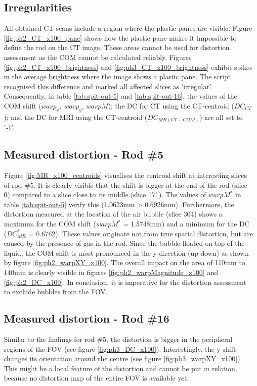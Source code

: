 \subsection{Irregularities}
All obtained CT scans include a region where the plastic panes are visible.
Figure \ref{fig:ph2_CT_x100_pane} shows how the plastic pane makes it impossible to define the rod on the CT image.
These areas cannot be used for distortion assessment as the COM cannot be calculated reliably.
Figures \ref{fig:ph2_CT_x100_brightness} and \ref{fig:ph3_CT_x100_brightness} exhibit spikes in the average brightness where the image shows a plastic pane.
The script recognised this difference and marked all affected slices as 'irregular'.
Consequently, in table \ref{tab:spit-out-5} and \ref{tab:spit-out-16}, the values of the COM shift ($warp_x$, $warp_y$, $warpM$); the DC for CT using the CT-centroid ($DC_{CT}$); and the DC for MRI using the CT-centroid ($DC_{MR(CT-COM)}$) are all set to '-1'.

\subsection{Measured distortion - Rod \#5}

Figure \ref{fig:MR_x100_centroids} visualises the centroid shift at interesting slices of rod \#5.
It is clearly visible that the shift is bigger at the end of the rod (slice 0) compared to a slice close to its middle (slice 171).
The values of $warpM^*$ in table \ref{tab:spit-out-5} verify this (1.0623mm > 0.6926mm).
Furthermore, the distortion measured at the location of the air bubble (slice 304) shows a maximum for the COM shift ($warpM^*$ = 1.5748mm) and a minimum for the DC ($DC^*_{MR}$ = 0.6762).
These values originate not from true spatial distortion, but are caused by the presence of gas in the rod.
Since the bubble floated on top of the liquid, the COM shift is most pronounced in the y direction (up-down) as shown by figure \ref{fig:ph2_warpXY_x100}.
The overall impact on the area of 110mm to 140mm is clearly visible in figures \ref{fig:ph2_warpMagnitude_x100} and \ref{fig:ph2_DC_x100}.
In conclusion, it is imperative for the distortion assessment to exclude bubbles from the FOV.

\subsection{Measured distortion - Rod \#16}

Similar to the findings for rod \#5, the distortion is bigger in the peripheral regions of the FOV (see figure \ref{fig:ph3_DC_x100}).
Interestingly, the y shift changes its orientation around the centre (see figure \ref{fig:ph3_warpXY_x100}).
This might be a local feature of the distortion and cannot be put in relation, because no distortion map of the entire FOV is available yet.

